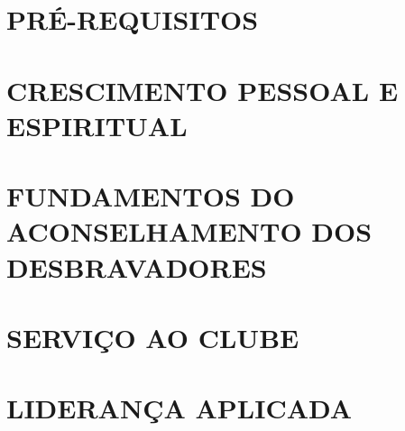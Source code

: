 \documentclass[12pt]{pastald}
\begin{document}

\newpage
\tableofcontents



\newpage
\vspace*{\fill}
\thispagestyle{empty}
\section*{PRÉ-REQUISITOS}
%
\vspace*{\fill}





\newpage
\vspace*{\fill}
\thispagestyle{empty}
\section{CRESCIMENTO PESSOAL E ESPIRITUAL}
\vspace*{\fill}





\newpage
\vspace*{\fill}
\thispagestyle{empty}
\section{FUNDAMENTOS DO ACONSELHAMENTO DOS DESBRAVADORES}
\vspace*{\fill}





\newpage
\vspace*{\fill}
\thispagestyle{empty}
\section{SERVIÇO AO CLUBE}
\vspace*{\fill}





\newpage
\vspace*{\fill}
\thispagestyle{empty}
\section{LIDERANÇA APLICADA}
\vspace*{\fill}


\end{document}
